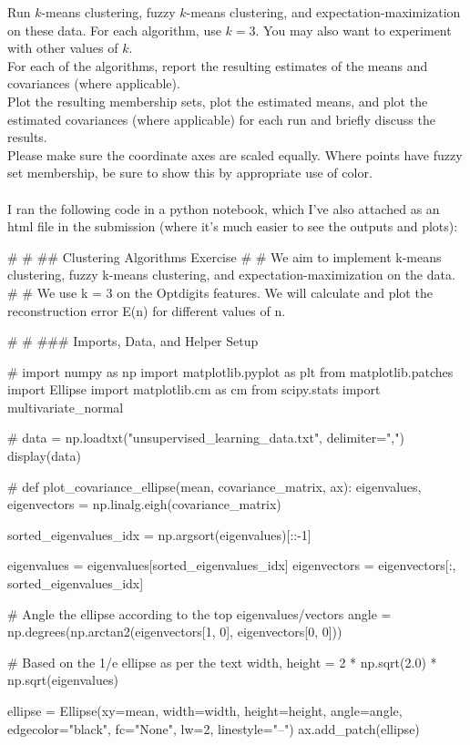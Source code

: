 \documentclass{article}
\begin{document}
\thispagestyle{firstpageheader}
{\Large 
Run \(k\)-means clustering, fuzzy \(k\)-means clustering, and expectation-maximization on these data. For each algorithm, use \(k = 3\). You may also want to experiment with other values of \(k\). \\
For each of the algorithms, report the resulting estimates of the means and covariances (where applicable). \\
Plot the resulting membership sets, plot the estimated means, and plot the estimated covariances (where applicable) for each run and briefly discuss the results. \\
Please make sure the coordinate axes are scaled equally. Where points have fuzzy set membership, be sure to show this by appropriate use of color. \\ \\
I ran the following code in a python notebook, which I've also attached as an html file in the submission (where it's much easier to see the outputs and plots):
\begin{spverbatim}
# %
# ## Clustering Algorithms Exercise
# 
# We aim to implement k-means clustering, fuzzy k-means clustering, and expectation-maximization on the data.
# 
# We use k = 3 on the Optdigits features. We will calculate and plot the reconstruction error E(n) for different values of n.

# %
# ### Imports, Data, and Helper Setup

# %
import numpy as np
import matplotlib.pyplot as plt
from matplotlib.patches import Ellipse
import matplotlib.cm as cm
from scipy.stats import multivariate_normal

# %
data = np.loadtxt("unsupervised_learning_data.txt", delimiter=",")
display(data)

# %
def plot_covariance_ellipse(mean, covariance_matrix, ax):
  eigenvalues, eigenvectors = np.linalg.eigh(covariance_matrix)

  sorted_eigenvalues_idx = np.argsort(eigenvalues)[::-1]

  eigenvalues = eigenvalues[sorted_eigenvalues_idx]
  eigenvectors = eigenvectors[:, sorted_eigenvalues_idx]

  # Angle the ellipse according to the top eigenvalues/vectors
  angle = np.degrees(np.arctan2(eigenvectors[1, 0], eigenvectors[0, 0]))

  # Based on the 1/e ellipse as per the text
  width, height = 2 * np.sqrt(2.0) * np.sqrt(eigenvalues)

  ellipse = Ellipse(xy=mean, width=width, height=height, angle=angle, 
                    edgecolor="black", fc="None", lw=2, linestyle="--")
  ax.add_patch(ellipse)


\end{spverbatim}}
\end{document}
